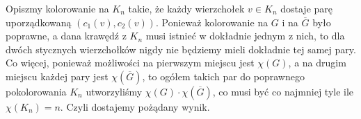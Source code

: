 \documentclass{article}
\begin{document}
Opiszmy kolorowanie na $K_n$ takie, że każdy wierzchołek $v\in K_n$ dostaje parę uporządkowaną $(c_1(v), c_2(v))$. Ponieważ kolorowanie na $G$ i na $\overline G$ było poprawne, a dana krawędź z $K_n$ musi istnieć w dokładnie jednym z nich, to dla dwóch stycznych wierzchołków nigdy nie będziemy mieli dokładnie tej samej pary. Co więcej, ponieważ możliwości na pierwszym miejscu jest $\chi(G)$, a na drugim miejscu każdej pary jest $\chi(\overline G)$, to ogółem takich par do poprawnego pokolorowania $K_n$ utworzyliśmy $\chi(G)\cdot\chi(\overline G)$, co musi być co najmniej tyle ile $\chi(K_n)=n$. Czyli dostajemy pożądany wynik.
\end{document}
